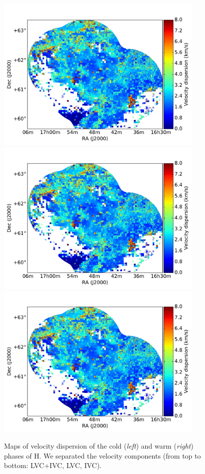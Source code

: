 \documentclass[traditabstract]{aa}
\begin{document}
\begin{figure}[h]
  \hspace{3mm}
  \includegraphics[page=5,height=7.5cm,trim=45 5 65 35,clip=true]{Figures/DHIGLS_disp.pdf} \\
  \vspace{3mm}
  \includegraphics[page=3,height=7.5cm,trim=45 5 65 35,clip=true]{Figures/DHIGLS_disp.pdf}
  \hspace{3mm}
  \includegraphics[page=6,height=7.5cm,trim=45 5 65 35,clip=true]{Figures/DHIGLS_disp.pdf}
  \caption{Maps of velocity dispersion of the cold (\emph{left}) and warm (\emph{right}) phases of H. We separated the velocity components (from top to bottom: LVC+IVC, LVC, IVC).}
\end{figure}
\end{document}
